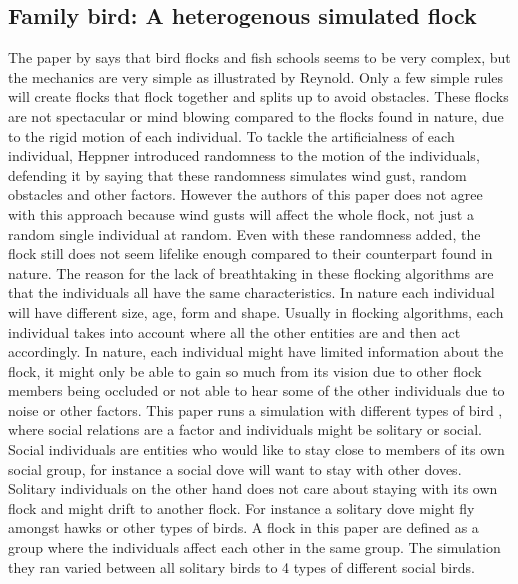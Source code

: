 \subsection{Family bird: A heterogenous simulated flock}
The paper \citep{Demsar2013} by \citeauthor{Demsar2013} says that bird flocks and fish schools seems to be very complex, but the mechanics are very simple as illustrated by Reynold. Only a few simple rules will create flocks that flock together and splits up to avoid obstacles. These flocks are not spectacular or mind blowing compared to the flocks found in nature, due to the rigid motion of each individual. To tackle the artificialness of each individual, Heppner introduced randomness to the motion of the individuals, defending it by saying that these randomness simulates wind gust, random obstacles and other factors. 
However the authors of this paper does not agree with this approach because wind gusts will affect the whole flock, not just a random single individual at random. Even with these randomness added, the flock still does not seem lifelike enough compared to their counterpart found in nature. The reason for the lack of breathtaking in these flocking algorithms are that the individuals all have the same characteristics. In nature each individual will have different size, age, form and shape. 
Usually in flocking algorithms, each individual takes into account where all the other entities are and then act accordingly. In nature, each individual might have limited information about the flock, it might only be able to gain so much from its vision due to other flock members being occluded or not able to hear some of the other individuals due to noise or other factors.
This paper runs a simulation with different types of bird , where social relations are a factor and individuals might be solitary or social. Social individuals are entities who would like to stay close to members of its own social group, for instance a social dove will want to stay with other doves. Solitary individuals on the other hand does not care about staying with its own flock and might drift to another flock. For instance a solitary dove might fly amongst hawks or other types of birds. A flock in this paper are defined as a group where the individuals affect each other in the same group. The simulation they ran varied between all solitary birds to 4 types of different social birds.

